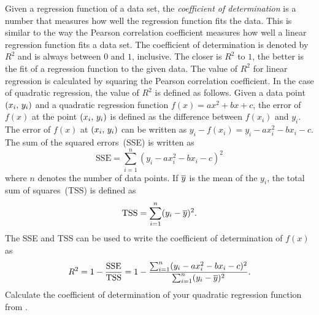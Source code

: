 \documentclass[a4paper,oneside,12pt]{article}
\begin{document}
\begin{problem}
\begin{packedenum}
  \item\label{subprob:quadratic_applications:bluegill_coefficient_determination}
    Given a regression function of a data set, the
    \emph{coefficient of determination} is a number that measures how
    well the regression function fits the data.  This is similar to
    the way the Pearson correlation coefficient measures how well a
    linear regression function fits a data set.  The coefficient of
    determination is denoted by $R^2$ and is always between $0$ and
    $1$, inclusive.  The closer is $R^2$ to $1$, the better is the fit
    of a regression function to the given data.  The value of $R^2$
    for linear regression is calculated by squaring the Pearson
    correlation coefficient.  In the case of quadratic regression, the
    value of $R^2$ is defined as follows.  Given a data point
    $\left\lparen{x_i},\, {y_i}\right\rparen$ and a quadratic regression function
    $f(x) = ax^2 + bx + c$, the error of $f(x)$ at the point
    $\left\lparen{x_i},\, {y_i}\right\rparen$ is defined as the difference between $f(x_i)$
    and $y_i$.  The error of $f(x)$ at $\left\lparen{x_i},\, {y_i}\right\rparen$ can be
    written as $y_i - f(x_i) = y_i - ax_i^2 - bx_i - c$.  The sum of
    the squared errors~(SSE) is written as
    \[
    \text{SSE}
    =
    \sum_{i=1}^n (y_i - ax_i^2 - bx_i - c)^2
    \]
    where $n$ denotes the number of data points.  If $\overline{y}$ is the
    mean of the $y_i$, the total sum of squares~(TSS) is defined as
    \[
    \text{TSS}
    =
    \sum_{i=1}^n (y_i - \overline{y})^2.
    \]
    The SSE and TSS can be used to write the coefficient of
    determination of $f(x)$ as
    \[
    R^2
    =
    1
    -
    \frac{\text{SSE}}{\text{TSS}}
    =
    1
    -
    \frac{
      \sum_{i=1}^n (y_i - ax_i^2 - bx_i - c)^2
    }{
      \sum_{i=1}^n (y_i - \overline{y})^2
    }.
    \]
    Calculate the coefficient of determination of your quadratic
    regression function
    from .


\end{packedenum}
\end{problem}
\end{document}
